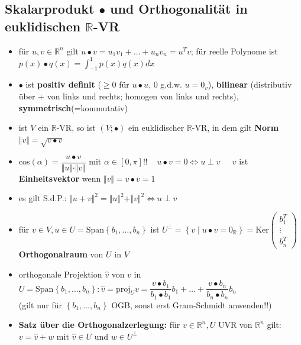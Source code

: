 \documentclass[10pt,a4paper]{article}
\begin{document}
\subsection{Skalarprodukt $\bullet$ und Orthogonalität in euklidischen $\mathbb{R}$-VR}
\begin{itemize}
\item für $u,v \in \mathbb{R}^{n}$ gilt $u\bullet v=u_{1}v_{1}+\dotsc +u_{n}v_{n}=u^{T}v$; für reelle Polynome ist $p(x)\bullet q(x)=\int_{-1}^{1} p(x)q(x) dx$
\item $\bullet$ ist \textbf{positiv definit} ($\geq 0$ für $u\bullet u$, 0 g.d.w. $u=0_{v}$), \textbf{bilinear} (distributiv über + von links und rechts; homogen von links und rechts), \textbf{symmetrisch}(=kommutativ)


\item ist $V$ ein $\mathbb{R}$-VR, so ist $(V;\bullet)$ ein euklidischer $\mathbb{R}$-VR, in dem gilt \textbf{Norm} $\Vert v \Vert=\sqrt{v\bullet v}$ 
\item cos$(\alpha)=\dfrac{u\bullet v}{\Vert u \Vert \cdot \Vert v\Vert}$ mit $\alpha\in [0,\pi]$!!$\;\;\;\; u \bullet v=0 \Leftrightarrow u\perp v$ $\;\;\;\;v$ ist \textbf{Einheitsvektor} wenn $\Vert v \Vert=v\bullet v=1$
\item es gilt S.d.P.: $\Vert u+v\Vert^2=\Vert u\Vert^2 +\Vert v \Vert^2 \Leftrightarrow u\perp v$


\item für $v\in V,u\in U=\text{Span}\left\lbrace b_{1},\dotsc,b_{n}\right\rbrace$ ist $U^{\perp}=\left\lbrace v\mid u\bullet v=0_{\mathbb{R}}\right\rbrace=\text{Ker}\begin{pmatrix}
b_{1}^{T}\\\vdots\\b_{n}^{T}
\end{pmatrix}$ \textbf{Orthogonalraum} von $U$ in $V$


\item orthogonale Projektion $\hat{v}$ von $v$ in $U=\text{Span}\left\lbrace b_{1},\dotsc,b_{n}\right\rbrace: \hat{v}=\text{proj}_{U}v=\dfrac{v\bullet b_{1}}{b_{1}\bullet b_{1}}b_{1}+\dotsc+\dfrac{v\bullet b_{n}}{b_{n}\bullet b_{n}}b_{n}$\\ 
(gilt nur für $\left\lbrace b_{1},\dotsc,b_{n}\right\rbrace$ OGB, sonst erst Gram-Schmidt anwenden!!) 
\item \textbf{Satz über die Orthogonalzerlegung:} für $v\in \mathbb{R}^{n},U$ UVR von $\mathbb{R}^{n}$ gilt: $v=\hat{v}+w$ mit $\hat{v}\in U$ und $w\in U^{\perp}$
\end{itemize}
\end{document}
